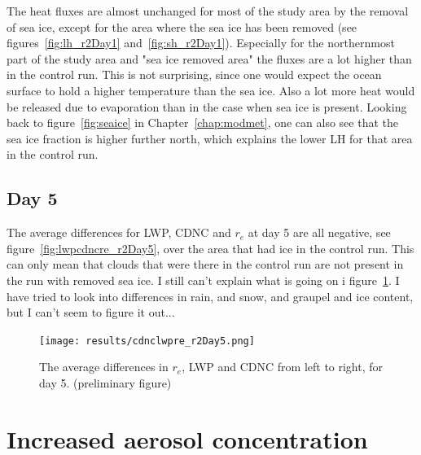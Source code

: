 The heat fluxes are almost unchanged for most of the study area by the removal of sea ice, except for the area where the sea ice has been removed (see figures~\ref{fig:lh_r2Day1} and~\ref{fig:sh_r2Day1}). Especially for the northernmost part of the study area and "sea ice removed area" the fluxes are a lot higher than in the control run. This is not surprising, since one would expect the ocean surface to hold a higher temperature than the sea ice. Also a lot more heat would be released due to evaporation than in the case when sea ice is present. Looking back to figure~\ref{fig:seaice} in Chapter~\ref{chap:modmet}, one can also see that the sea ice fraction is higher further north, which explains the lower LH for that area in the control run.

\subsection{Day 5}
The average differences for LWP, CDNC and $r_e$ at day 5 are all negative, see figure~\ref{fig:lwpcdncre_r2Day5}, over the area that had ice in the control run. This can only mean that clouds that were there in the control run are not present in the run with removed sea ice. 
I still can't explain what is going on i figure~\ref{fig:relwpcdnc_r2Day5}. I have tried to look into differences in rain, and snow, and graupel and ice content, but I can't seem to figure it out...
\begin{figure}
\centering
\texttt{[image: results/cdnclwpre\_r2Day5.png]}
\caption{The average differences in $r_e$, LWP and CDNC from left to right, for day 5. (preliminary figure)}
\label{fig:relwpcdnc_r2Day5}
\end{figure}

\section{Increased aerosol concentration}
